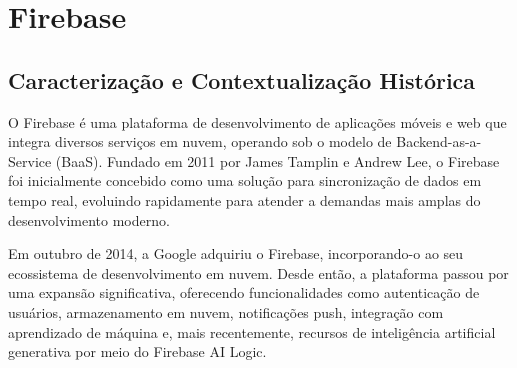 \section{Firebase}
\subsection{Caracterização e Contextualização Histórica}

O Firebase é uma plataforma de desenvolvimento de aplicações móveis e web que integra diversos serviços em nuvem, operando sob o modelo de Backend-as-a-Service (BaaS). Fundado em 2011 por James Tamplin e Andrew Lee, o Firebase foi inicialmente concebido como uma solução para sincronização de dados em tempo real, evoluindo rapidamente para atender a demandas mais amplas do desenvolvimento moderno\cite{firebase2025cloudnext}.

Em outubro de 2014, a Google adquiriu o Firebase, incorporando-o ao seu ecossistema de desenvolvimento em nuvem. Desde então, a plataforma passou por uma expansão significativa, oferecendo funcionalidades como autenticação de usuários, armazenamento em nuvem, notificações push, integração com aprendizado de máquina e, mais recentemente, recursos de inteligência artificial generativa por meio do Firebase AI Logic.
\begin{comment}
	O Firebase constitui-se como uma plataforma abrangente de desenvolvimento para aplicações móveis e web, tendo sido incorporada ao portfólio de soluções da Google Inc. em outubro de 2014 através de processo de aquisição estratégica \cite{google2014firebase}. Originalmente fundada em 2011 por James Tamplin e Andrew Lee, a plataforma Firebase foi concebida com o propósito de fornecer uma infraestrutura de backend-as-a-service (BaaS) completa e de alta usabilidade, direcionada especificamente para simplificar o processo de desenvolvimento e implementação de aplicações digitais \cite{tamplin2021firebase}.
	
	A filosofia de desenvolvimento da plataforma fundamenta-se na disponibilização de um ecossistema integrado de serviços diversos, que abrangem desde funcionalidades básicas de armazenamento de dados até recursos avançados de análise comportamental e engajamento de usuários \cite{firebase2023docs}. Esta abordagem holística visa reduzir a complexidade técnica tradicionalmente associada ao desenvolvimento de backends customizados, permitindo que desenvolvedores concentrem seus esforços na criação de interfaces e experiências de usuário diferenciadas.
\end{comment}


